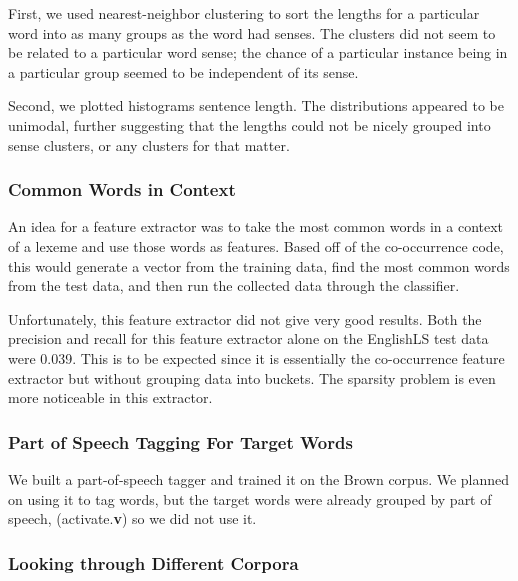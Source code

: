 \documentclass{article}
\begin{document}
First, we used nearest-neighbor clustering to sort the lengths for a particular
word into as many groups as the word had senses. The clusters did not seem to be
related to a particular word sense; the chance of a particular instance being in
a particular group seemed to be independent of its sense.

Second, we plotted histograms sentence length. The distributions appeared to be
unimodal, further suggesting that the lengths could not be nicely grouped into
sense clusters, or any clusters for that matter.

\subsubsection{Common Words in Context}

An idea for a feature extractor was to take the most common words in a context
of a lexeme and use those words as features. Based off of the co-occurrence code,
this would generate a vector from the training data, find the most common words
from the test data, and then run the collected data through the classifier.

Unfortunately, this feature extractor did not give very good results. Both the
precision and recall for this feature extractor alone on the EnglishLS test data
were 0.039. This is to be expected since it is essentially the co-occurrence
feature extractor but without grouping data into buckets. The sparsity problem
is even more noticeable in this extractor.

\subsubsection{Part of Speech Tagging For Target Words}

We built a part-of-speech tagger and trained it on the Brown corpus. We planned
on using it to tag words, but the target words were already grouped by part of
speech, (activate.\textbf{v}) so we did not use it.



\subsubsection{Looking through Different Corpora}
\end{document}
